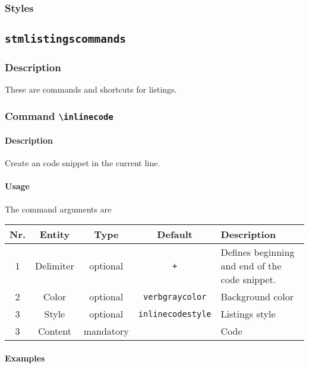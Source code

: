 \documentclass[%
  type=article,%
  layout=koma,%
  hyperref=true,%
  date=true,%
  listings=false,%
  tabular=true,%
]{stmtext}
\begin{document}
\subsubsection{Styles}
\label{sec:usage:preamble:styles:styles}

\subsection{\protect\texttt{stmlistingscommands}}
\label{sec:usage:preamble:commands}

\subsubsection{Description}
\label{sec:usage:preamble:commands:description}

These are commands and shortcuts for listings.

\subsubsection{Command \protect\texttt{\textbackslash inlinecode}}
\label{sec:usage:preamble:commands:inlinecode}

\paragraph{Description}

Create an code snippet in the current line.

\paragraph{Usage} The command arguments are\mbox{}\\

\begin{tabularx}{\linewidth}{ccccX}
\toprule
Nr.  & Entity & Type & Default  & Description\\
\midrule
1 & Delimiter & optional & \verb|+| & Defines beginning and end of the code snippet.\\
2 & Color & optional & \verb|verbgraycolor| & Background color\\
3 & Style & optional & \verb|inlinecodestyle| & Listings style\\
3 & Content & mandatory &  & Code\\
\bottomrule
\end{tabularx}


\paragraph{Examples}
\end{document}
